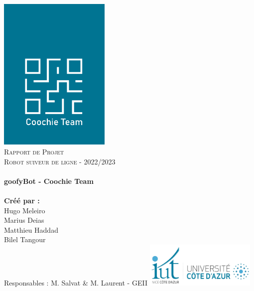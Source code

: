\begin{titlepage}
    \vbox{ }

    \vbox{ }

    \begin{center}
        \includegraphics[width=0.40\textwidth]{img/logos/logo.png}\\[1cm]
        \textsc{\Large Rapport de Projet}\\[0.2cm]
        \textsc{\Large Robot suiveur de ligne - 2022/2023}\\[0.6cm]

        \noindent\makebox[\linewidth]{\rule{.7\paperwidth}{.6pt}}\\[0.7cm]
        { \huge \bfseries goofyBot - Coochie Team}\\[0.25cm]
        \noindent\makebox[\linewidth]{\rule{.7\paperwidth}{.6pt}}\\[0.7cm]
        \large{\bfseries Créé par :}\\[0.1cm]
        \large{Hugo Meleiro}\\[0.1cm]
        \large{Marius Deias}\\[0.1cm]
        \large{Matthieu Haddad}\\[0.1cm]
        \large{Bilel Tangour}\\[0.5cm]
        \large{Responsables : M. Salvat \& M. Laurent - GEII}
        \vfill
        \large
        \includegraphics[width=0.4\textwidth]{img/logos/iut.png}\\[1cm]

    \end{center}
\end{titlepage}
